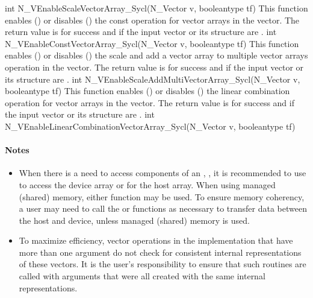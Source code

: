 {
  int N\_VEnableScaleVectorArray\_Sycl(N\_Vector v, booleantype tf)
}
{
  This function enables () or disables () the const
  operation for vector arrays in the {\sycl} vector. The return value is  for
  success and  if the input vector or its  structure are .
}
{
  int N\_VEnableConstVectorArray\_Sycl(N\_Vector v, booleantype tf)
}
{
  This function enables () or disables () the scale and
  add a vector array to multiple vector arrays operation in the {\sycl} vector. The
  return value is  for success and  if the input vector or its
   structure are .
}
{
  int N\_VEnableScaleAddMultiVectorArray\_Sycl(N\_Vector v, booleantype tf)
}
{
  This function enables () or disables () the linear
  combination operation for vector arrays in the {\sycl} vector. The return value
  is  for success and  if the input vector or its  structure
  are .
}
{
  int N\_VEnableLinearCombinationVectorArray\_Sycl(N\_Vector v,
  booleantype tf)
}
\paragraph{\bf Notes}

\begin{itemize}

\item
  When there is a need to access components of an , ,
  it is recommended to use  to access the device
  array or  for the host array. When using managed
  (shared) memory, either function may be used. To ensure memory coherency, a
  user may need to call the  or  functions as necessary
  to transfer data between the host and device, unless managed (shared) memory
  is used.

\item
  {\warn}To maximize efficiency, vector operations in the {\nvecsycl} implementation
  that have more than one  argument do not check for
  consistent internal representations of these vectors. It is the user's
  responsibility to ensure that such routines are called with 
  arguments that were all created with the same internal representations.

\end{itemize}

